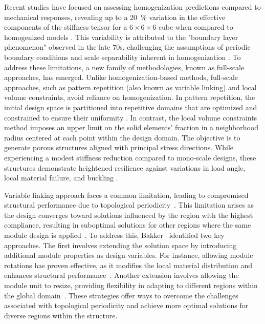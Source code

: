 Recent studies have focused on assessing homogenization predictions compared to mechanical responses, revealing up to a \qty{20}{\percent} variation in the effective components of the stiffness tensor for a $6\times6\times6$ cube when compared to homogenized models . This variability is attributed to the "boundary layer phenomenon" observed in the late 70s, challenging the assumptions of periodic boundary conditions and scale separability inherent in homogenization . To address these limitations, a new family of methodologies, known as full-scale approaches, has emerged. Unlike homogenization-based methods, full-scale approaches, such as pattern repetition (also known as variable linking) and local volume constraints, avoid reliance on homogenization. In pattern repetition, the initial design space is partitioned into repetitive domains that are optimized and constrained to ensure their uniformity . In contrast, the local volume constraints method imposes an upper limit on the solid elements' fraction in a neighborhood radius centered at each point within the design domain. The objective is to generate porous structures aligned with principal stress directions. While experiencing a modest stiffness reduction compared to mono-scale designs, these structures demonstrate heightened resilience against variations in load angle, local material failure, and buckling .

Variable linking approach faces a common limitation, leading to compromised structural performance due to topological periodicity~. This limitation arises as the design converges toward solutions influenced by the region with the highest compliance, resulting in suboptimal solutions for other regions where the same module design is applied~. To address this, Bakker~ identified two key approaches. The first involves extending the solution space by introducing additional module properties as design variables. For instance, allowing module rotations has proven effective, as it modifies the local material distribution and enhances structural performance~. Another extension involves allowing the module unit to resize, providing flexibility in adapting to different regions within the global domain~. These strategies offer ways to overcome the challenges associated with topological periodicity and achieve more optimal solutions for diverse regions within the structure.